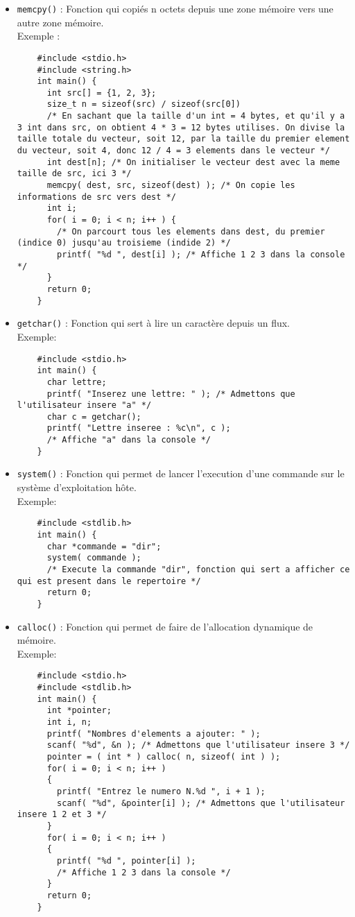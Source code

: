 \documentclass[10pt]{article}
\begin{document}
\begin{itemize}
\item \texttt{memcpy()} : Fonction qui copiés n octets depuis une zone mémoire vers une autre zone mémoire.\\
  Exemple :
  \begin{lstlisting}
    #include <stdio.h>
    #include <string.h>
    int main() {
      int src[] = {1, 2, 3};
      size_t n = sizeof(src) / sizeof(src[0])
      /* En sachant que la taille d'un int = 4 bytes, et qu'il y a 3 int dans src, on obtient 4 * 3 = 12 bytes utilises. On divise la taille totale du vecteur, soit 12, par la taille du premier element du vecteur, soit 4, donc 12 / 4 = 3 elements dans le vecteur */
      int dest[n]; /* On initialiser le vecteur dest avec la meme taille de src, ici 3 */
      memcpy( dest, src, sizeof(dest) ); /* On copie les informations de src vers dest */
      int i;
      for( i = 0; i < n; i++ ) {
        /* On parcourt tous les elements dans dest, du premier (indice 0) jusqu'au troisieme (indide 2) */
        printf( "%d ", dest[i] ); /* Affiche 1 2 3 dans la console */
      }
      return 0;
    }
  \end{lstlisting}
  
\item \texttt{getchar()} : Fonction qui sert à lire un caractère depuis un flux.\\
  Exemple:
  \begin{lstlisting}
    #include <stdio.h>
    int main() {
      char lettre;
      printf( "Inserez une lettre: " ); /* Admettons que l'utilisateur insere "a" */
      char c = getchar();
      printf( "Lettre inseree : %c\n", c );
      /* Affiche "a" dans la console */
    }
  \end{lstlisting}

\item \texttt{system()} : Fonction qui permet de lancer l'execution d'une commande sur le système d'exploitation hôte.\\
  Exemple:
  \begin{lstlisting}
    #include <stdlib.h>
    int main() {
      char *commande = "dir";
      system( commande );
      /* Execute la commande "dir", fonction qui sert a afficher ce qui est present dans le repertoire */
      return 0;
    }
  \end{lstlisting}

\item \texttt{calloc()} : Fonction qui permet de faire de l'allocation dynamique de mémoire.\\
  Exemple:
  \begin{lstlisting}
    #include <stdio.h>
    #include <stdlib.h>
    int main() {
      int *pointer;
      int i, n;
      printf( "Nombres d'elements a ajouter: " );
      scanf( "%d", &n ); /* Admettons que l'utilisateur insere 3 */
      pointer = ( int * ) calloc( n, sizeof( int ) );
      for( i = 0; i < n; i++ )
      {
        printf( "Entrez le numero N.%d ", i + 1 );
        scanf( "%d", &pointer[i] ); /* Admettons que l'utilisateur insere 1 2 et 3 */
      }
      for( i = 0; i < n; i++ )
      {
        printf( "%d ", pointer[i] );
        /* Affiche 1 2 3 dans la console */
      }
      return 0;
    }
  \end{lstlisting}
  

\end{itemize}
\end{document}
